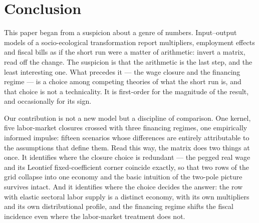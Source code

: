 \section{Conclusion}\label{sec:conclusion}

This paper began from a suspicion about a genre of numbers. Input--output
models of a socio-ecological transformation report multipliers, employment
effects and fiscal bills as if the short run were a matter of arithmetic:
invert a matrix, read off the change. The suspicion is that the arithmetic
is the last step, and the least interesting one. What precedes it --- the
wage closure and the financing regime --- is a choice among competing
theories of what the short run is, and that choice is not a technicality.
It is first-order for the magnitude of the result, and occasionally for its
sign.

Our contribution is not a new model but a discipline of comparison. One
kernel, five labor-market closures crossed with three financing regimes,
one empirically informed impulse: fifteen scenarios whose differences are
entirely attributable to the assumptions that define them. Read this way,
the matrix does two things at once. It identifies where the closure choice
is redundant --- the pegged real wage and its Leontief fixed-coefficient
corner coincide exactly, so that two rows of the grid collapse into one
economy and the basic intuition of the two-pole picture survives intact.
And it identifies where the choice decides the answer: the row with elastic
sectoral labor supply is a distinct economy, with its own multipliers and
its own distributional profile, and the financing regime shifts the fiscal
incidence even where the labor-market treatment does not.

